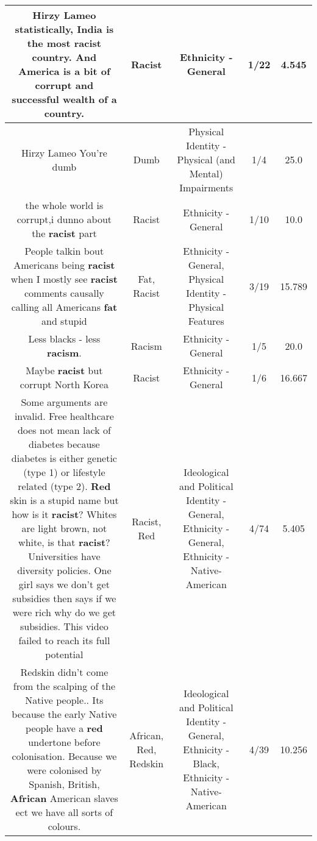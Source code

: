 \documentclass[11pt]{article}
\newlength\mylength
\begin{document}
\begin{center}
\begin{longtable}{|C{.65\mylength}|C{.30\mylength}|C{.12\mylength}|C{.12\mylength}|C{.12\mylength}|}
  \small Hirzy Lameo statistically, India is the most \textbf{racist} country. And America is a bit of corrupt and successful wealth of a country.\normalsize   & Racist & Ethnicity - General & 1/22 & 4.545 \\  \hline
  \small Hirzy Lameo You're dumb\normalsize   & Dumb & Physical Identity - Physical (and Mental) Impairments & 1/4 & 25.0 \\  \hline
  \small the whole world is corrupt,i dunno about the \textbf{racist} part\normalsize   & Racist & Ethnicity - General & 1/10 & 10.0 \\  \hline
  \small People talkin bout Americans being \textbf{racist} when I mostly see \textbf{racist} comments causally calling all Americans \textbf{fat} and stupid\normalsize   & Fat, Racist & Ethnicity - General, Physical Identity - Physical Features & 3/19 & 15.789 \\  \hline
  \small Less blacks - less \textbf{racism}.\normalsize   & Racism & Ethnicity - General & 1/5 & 20.0 \\  \hline
  \small Maybe \textbf{racist} but corrupt North Korea\normalsize   & Racist & Ethnicity - General & 1/6 & 16.667 \\  \hline
  \small Some arguments are invalid. Free healthcare does not mean lack of diabetes because diabetes is either genetic (type 1) or lifestyle related (type 2). \textbf{R\textbf{ed}} skin is a stupid name but how is it \textbf{racist}? Whites are light brown, not white, is that \textbf{racist}? Universities have diversity policies. One girl says we don't get subsidies then says if we were rich why do we get subsidies. This video failed to reach its full potential\normalsize   & Racist, Red &  Ideological and Political Identity - General, Ethnicity - General, Ethnicity - Native-American & 4/74 & 5.405 \\  \hline
  \small Redskin didn't come from the scalping of the Native people.. Its because the early Native people have a \textbf{r\textbf{ed}} undertone before colonisation. Because we were colonised by Spanish, British, \textbf{African} American slaves ect we have all sorts of colours.\normalsize   & African, Red, Redskin &  Ideological and Political Identity - General, Ethnicity - Black, Ethnicity - Native-American & 4/39 & 10.256 \\  \hline

\end{longtable}
\end{center}
\end{document}
